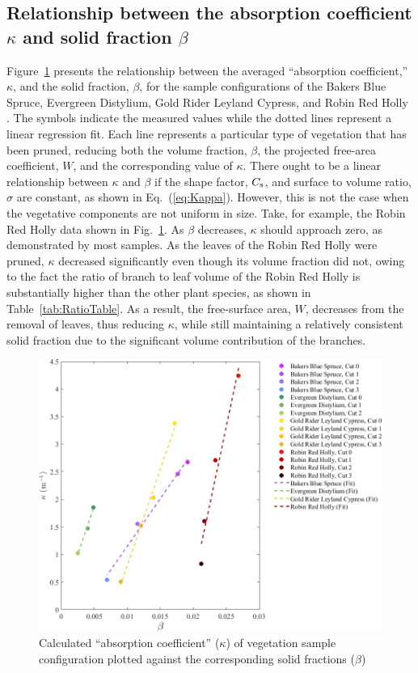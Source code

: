 \documentclass[12pt]{article}
\begin{document}
\subsection{Relationship between the absorption coefficient $\kappa$ and solid fraction $\beta$ }

Figure~\ref{fig:betavkappa} presents the relationship between the averaged ``absorption coefficient,'' $\kappa$, and the solid fraction, $\beta$, for the sample configurations of the Bakers Blue Spruce, Evergreen Distylium, Gold Rider Leyland Cypress, and Robin Red Holly . The symbols indicate the measured values while the dotted lines represent a linear regression fit. Each line represents a particular type of vegetation that has been pruned, reducing both the volume fraction, $\beta$, the projected free-area coefficient, $W$, and the corresponding value of $\kappa$. There ought to be a linear relationship between $\kappa$ and $\beta$ if the shape factor, $C_{\rm s}$, and surface to volume ratio, $\sigma$ are constant, as shown in Eq.~(\ref{eq:Kappa}). However, this is not the case when the vegetative components are not uniform in size. Take, for example, the Robin Red Holly data shown in Fig.~\ref{fig:betavkappa}. As $\beta$ decreases, $\kappa$ should approach zero, as demonstrated by most samples. As the leaves of the Robin Red Holly were pruned, $\kappa$ decreased significantly even though its volume fraction did not, owing to the fact the ratio of branch to leaf volume of the Robin Red Holly is substantially higher than the other plant species, as shown in Table~\ref{tab:RatioTable}.  As a result, the free-surface area, $W$, decreases from the removal of leaves, thus reducing $\kappa$, while still maintaining a relatively consistent solid fraction due to the significant volume contribution of the branches.

\begin{figure}[!h]
	\centering 	
    \includegraphics[width=1\linewidth]{Picture12.jpg}
	\caption[Comparison of ``absorption coefficient,'' $\kappa$, and solid fraction, $\beta$]{Calculated ``absorption coefficient'' ($\kappa$) of vegetation sample configuration plotted against the corresponding solid fractions ($\beta$)}
	\label{fig:betavkappa}
\end{figure}
\end{document}
